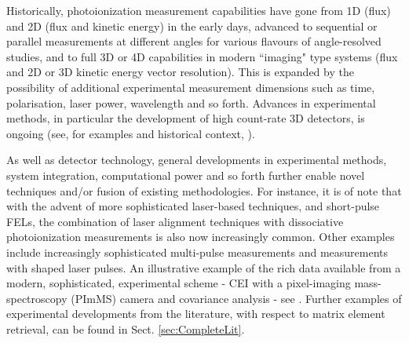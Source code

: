 Historically, photoionization measurement capabilities have gone from 1D (flux) and 2D (flux and kinetic energy) in the early days, advanced to sequential or parallel measurements at different angles for various flavours of angle-resolved studies, and to full 3D or 4D capabilities in modern ``imaging" type systems (flux and 2D or 3D kinetic energy vector resolution). This is expanded by the possibility of additional experimental measurement dimensions such as time, polarisation, laser power, wavelength and so forth. Advances in experimental methods, in particular the development of high count-rate 3D detectors, is ongoing (see, for examples and historical context, \cite{Parker1997,Dorner1997a,Continetti2001,Vallance2013,chandler2017PerspectiveAdvancedParticle}). 

As well as detector technology, general developments in experimental methods, system integration, computational power and so forth further enable novel techniques and/or fusion of existing methodologies. For instance, it is of note that with the advent of more sophisticated laser-based techniques, and short-pulse FELs, the combination of laser alignment techniques with dissociative photoionization measurements is also now increasingly common. Other examples include increasingly sophisticated multi-pulse measurements and measurements with shaped laser pulses. An illustrative example of the rich data available from a modern, sophisticated, experimental scheme - CEI with a pixel-imaging mass-spectroscopy (PImMS) camera and covariance analysis - see \cite{Slater2015}. Further examples of experimental developments from the literature, with respect to matrix element retrieval, can be found in Sect. \ref{sec:CompleteLit}.






